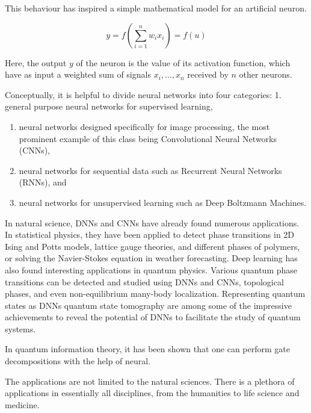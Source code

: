 \documentclass[11pt]{article}
\begin{document}
This behaviour has inspired a simple mathematical model for an
artificial neuron.

    \hypertarget{artificialNeuron}{}

\[
\begin{equation}
 y = f\left(\sum_{i=1}^n w_ix_i\right) = f(u)
\label{artificialNeuron} \tag{1}
\end{equation}
\]

    Here, the output \(y\) of the neuron is the value of its activation
function, which have as input a weighted sum of signals
\(x_i, \dots ,x_n\) received by \(n\) other neurons.

Conceptually, it is helpful to divide neural networks into four
categories: 1. general purpose neural networks for supervised learning,

\begin{enumerate}
\def\labelenumi{\arabic{enumi}.}
\setcounter{enumi}{1}
\item
  neural networks designed specifically for image processing, the most
  prominent example of this class being Convolutional Neural Networks
  (CNNs),
\item
  neural networks for sequential data such as Recurrent Neural Networks
  (RNNs), and
\item
  neural networks for unsupervised learning such as Deep Boltzmann
  Machines.
\end{enumerate}

In natural science, DNNs and CNNs have already found numerous
applications. In statistical physics, they have been applied to detect
phase transitions in 2D Ising and Potts models, lattice gauge theories,
and different phases of polymers, or solving the Navier-Stokes equation
in weather forecasting. Deep learning has also found interesting
applications in quantum physics. Various quantum phase transitions can
be detected and studied using DNNs and CNNs, topological phases, and
even non-equilibrium many-body localization. Representing quantum states
as DNNs quantum state tomography are among some of the impressive
achievements to reveal the potential of DNNs to facilitate the study of
quantum systems.

In quantum information theory, it has been shown that one can perform
gate decompositions with the help of neural.

The applications are not limited to the natural sciences. There is a
plethora of applications in essentially all disciplines, from the
humanities to life science and medicine.
\end{document}
